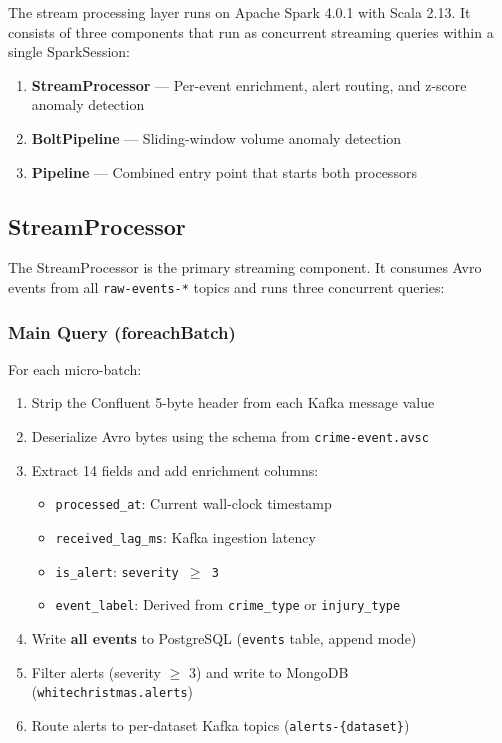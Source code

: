 \documentclass[12pt,a4paper]{article}
\begin{document}
The stream processing layer runs on Apache Spark 4.0.1 with Scala 2.13. It consists of three components that run as concurrent streaming queries within a single SparkSession:

\begin{enumerate}
  \item \textbf{StreamProcessor} --- Per-event enrichment, alert routing, and z-score anomaly detection
  \item \textbf{BoltPipeline} --- Sliding-window volume anomaly detection
  \item \textbf{Pipeline} --- Combined entry point that starts both processors
\end{enumerate}

\subsection{StreamProcessor}

The StreamProcessor is the primary streaming component. It consumes Avro events from all \texttt{raw-events-*} topics and runs three concurrent queries:

\subsubsection{Main Query (foreachBatch)}

For each micro-batch:
\begin{enumerate}
  \item Strip the Confluent 5-byte header from each Kafka message value
  \item Deserialize Avro bytes using the schema from \texttt{crime-event.avsc}
  \item Extract 14 fields and add enrichment columns:
  \begin{itemize}
    \item \texttt{processed\_at}: Current wall-clock timestamp
    \item \texttt{received\_lag\_ms}: Kafka ingestion latency
    \item \texttt{is\_alert}: \texttt{severity $\geq$ 3}
    \item \texttt{event\_label}: Derived from \texttt{crime\_type} or \texttt{injury\_type}
  \end{itemize}
  \item Write \textbf{all events} to PostgreSQL (\texttt{events} table, append mode)
  \item Filter alerts (severity $\geq$ 3) and write to MongoDB (\texttt{whitechristmas.alerts})
  \item Route alerts to per-dataset Kafka topics (\texttt{alerts-\{dataset\}})
\end{enumerate}
\end{document}
